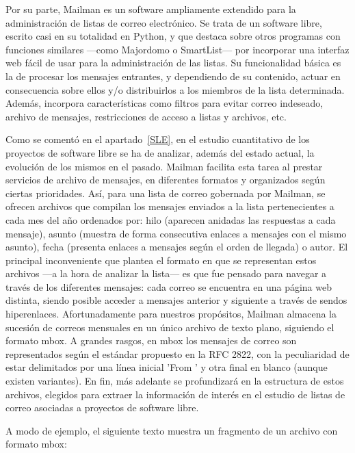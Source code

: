 Por su parte, Mailman es un software ampliamente extendido para la administración
de listas de correo electrónico. Se trata de un software libre, escrito casi
en su totalidad en Python, y que destaca sobre otros programas con funciones
similares ---como Majordomo o SmartList--- por incorporar una interfaz web fácil
de usar para la administración de las listas. Su funcionalidad básica es la
de procesar los mensajes entrantes, y dependiendo de su contenido, actuar en
consecuencia sobre ellos y/o distribuirlos a los miembros de la lista determinada.
Además, incorpora características como filtros para evitar correo indeseado,
archivo de mensajes, restricciones de acceso a listas y archivos, etc.

Como se comentó en el apartado~\ref{SLE}, en el estudio cuantitativo de los
proyectos de software libre se ha de analizar, además del estado actual, la
evolución de los mismos en el pasado. Mailman facilita esta tarea al prestar
servicios de archivo de mensajes, en diferentes formatos y organizados según
ciertas prioridades. Así, para una lista de correo gobernada por Mailman,
se ofrecen archivos que compilan los mensajes enviados a la lista pertenecientes
a cada mes del año ordenados por: hilo (aparecen anidadas las respuestas a
cada mensaje), asunto (muestra de forma consecutiva enlaces a mensajes con
el mismo asunto), fecha (presenta enlaces a mensajes según el orden de llegada)
o autor. El principal inconveniente que plantea el formato en que se representan
estos archivos ---a la hora de analizar la lista--- es que fue pensado para
navegar a través de los diferentes mensajes: cada correo se encuentra en una
página web distinta, siendo posible acceder a mensajes anterior y siguiente
a través de sendos hiperenlaces. Afortunadamente para nuestros propósitos,
Mailman almacena la sucesión de correos mensuales en un único archivo de
texto plano, siguiendo el formato mbox. A grandes rasgos, en mbox
los mensajes de correo son representados según el estándar propuesto en la
RFC 2822, con la peculiaridad de estar delimitados por una línea inicial
'From ' y otra final en blanco (aunque existen variantes). En fin, más
adelante se profundizará en la estructura de estos archivos, elegidos para
extraer la información de interés en el estudio de listas de
correo asociadas a proyectos de software libre.

A modo de ejemplo, el siguiente texto muestra un fragmento de un archivo
con formato mbox:

